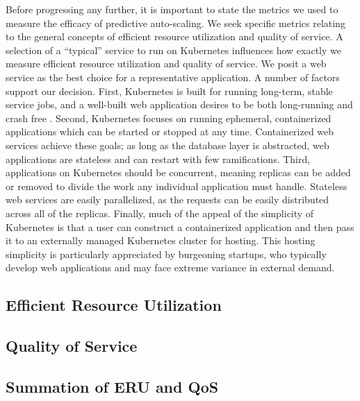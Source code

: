 Before progressing any further, it is important to state the metrics we used
to measure the efficacy of predictive auto-scaling. We seek specific metrics relating to
the general concepts of efficient resource utilization and quality of service.
A selection of a ``typical'' service to run on Kubernetes influences how exactly
we measure efficient resource utilization and quality of service. We posit
a web service as the best choice for a representative application. A number
of factors support our decision. First, Kubernetes is built for running
long-term, stable service jobs, and a well-built web application desires to be
both long-running and crash free \cite{k8s-design-overview}. Second, Kubernetes
focuses on running ephemeral, containerized applications which can be started or
stopped at any time. Containerized web services achieve these goals; as
long as the database layer is abstracted, web applications are stateless and can
restart with few ramifications. Third, applications on Kubernetes should be
concurrent, meaning replicas can be added or removed to divide the work any
individual application must handle. Stateless web services are easily
parallelized, as the requests can be easily distributed across all of the
replicas. Finally, much of the appeal of the simplicity of Kubernetes is that a
user can construct a containerized application and then pass it to an
externally managed Kubernetes cluster for hosting. This hosting simplicity is
particularly appreciated by burgeoning startups, who typically develop web
applications and may face extreme variance in external demand.

\subsection{Efficient Resource Utilization}



\subsection{Quality of Service}



\subsection{Summation of ERU and QoS}


